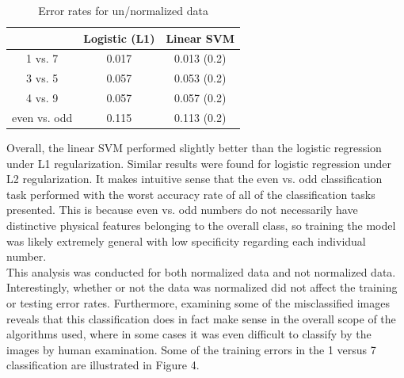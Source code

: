 \documentclass{article}
\begin{document}
\begin{table}
  \begin{center}
    \begin{tabular}{ | c | c | c | }
      \hline
                     & Logistic (L1)    & Linear SVM       \\ \hline
      1 vs. 7        & 0.017            & 0.013 (0.2)      \\ \hline
      3 vs. 5        & 0.057            & 0.053 (0.2)      \\ \hline
      4 vs. 9        & 0.057            & 0.057 (0.2)      \\ \hline
      even vs. odd   & 0.115            & 0.113 (0.2)      \\ \hline
    \end{tabular}
  \end{center}
  \caption{Error rates for un/normalized data}
\end{table}

Overall, the linear SVM performed slightly better than the logistic regression under L1 regularization. Similar results were found for logistic regression under L2 regularization. It makes intuitive sense that the even vs. odd classification task performed with the worst accuracy rate of all of the classification tasks presented. This is because even vs. odd numbers do not necessarily have distinctive physical features belonging to the overall class, so training the model was likely extremely general with low specificity regarding each individual number. \\

This analysis was conducted for both normalized data and not normalized data. Interestingly, whether or not the data was normalized did not affect the training or testing error rates. Furthermore, examining some of the misclassified images reveals that this classification does in fact make sense in the overall scope of the algorithms used, where in some cases it was even difficult to classify by the images by human examination. Some of the training errors in the 1 versus 7 classification are illustrated in Figure 4.
\end{document}
